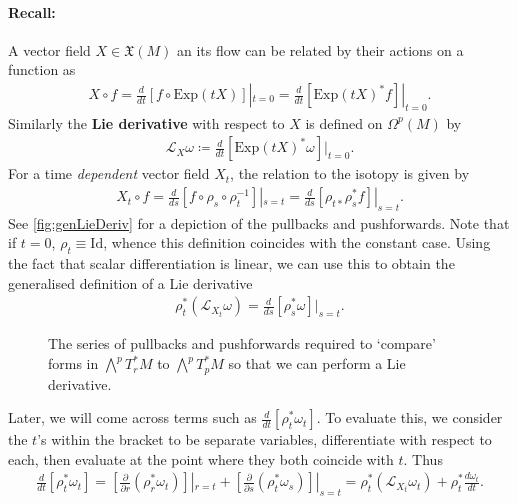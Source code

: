 \documentclass[11pt, final]{article}
\begin{document}
\paragraph{Recall:} A vector field $X \in \mathfrak{X}(M)$ an its flow can be related by their actions on a function as
	\begin{align}
		X \circ f = \frac{d}{dt} \left[ f \circ \mathrm{Exp}(tX) \right]|_{t=0}
				  = \frac{d}{dt} \left[ \mathrm{Exp}(tX)^* f \right]|_{t=0}.
	\end{align}
Similarly the \textbf{Lie derivative} with respect to $X$ is defined on $\Omega^p(M)$ by 
	\begin{align}
		\mathcal{L}_X \omega \coloneqq \frac{d}{dt} \left[ \mathrm{Exp}(tX)^* \omega \right]|_{t=0}.
	\end{align}
For a time \textit{dependent} vector field $X_t$, the relation to the isotopy is given by
	\begin{align}
		X_t \circ f = \frac{d}{ds} \left[ f \circ \rho_s \circ \rho_t^{-1} \right]|_{s=t} = \frac{d}{ds} \left[ \rho_{t*} \rho_s^* f \right]|_{s=t}.
	\end{align}
See \autoref{fig:genLieDeriv} for a depiction of the pullbacks and pushforwards. Note that if $t=0$, $\rho_t \equiv \mathrm{Id}$, whence this definition coincides with the constant case. Using the fact that scalar differentiation is linear, we can use this to obtain the generalised definition of a Lie derivative
	\begin{align}
		\rho_t^* \left( \mathcal{L}_{X_t} \omega \right) = \frac{d}{ds} \left[ \rho^*_s \omega \right]|_{s=t}.
	\end{align}
	\begin{figure}[h]
		\centering
			
		\caption{The series of pullbacks and pushforwards required to `compare' forms in $\bigwedge^p T^*_rM$ to $\bigwedge^p T^*_pM$ so that we can perform a Lie derivative.}
		\label{fig:genLieDeriv}
	\end{figure}
Later, we will come across terms such as $\tfrac{d}{dt} \left[ \rho_t^* \omega_t \right]$. To evaluate this, we consider the $t$'s within the bracket to be separate variables, differentiate with respect to each, then evaluate at the point where they both coincide with $t$. Thus
	\begin{align}\label{eq:doubleDerivative}
		\tfrac{d}{dt} \left[ \rho^*_t \omega_t \right] 
		= \left[ \tfrac{\partial}{\partial r} (\rho^*_r \omega_t) \right]|_{r=t} + \left[ \tfrac{\partial}{\partial s} (\rho^*_t \omega_s) \right]|_{s=t}
		= \rho^*_t (\mathcal{L}_{X_t} \omega_t) + \rho^*_t \frac{d \omega_t}{dt}.
	\end{align}
\end{document}

